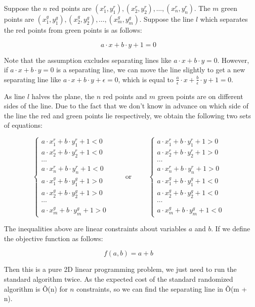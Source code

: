 
Suppose the $n$ red points are $(x_1^r, y_1^r), (x_2^r, y_2^r), \dots, (x_n^r, y_n^r)$. The $m$ green points are $(x_1^g, y_1^g), (x_2^g, y_2^g), \dots, (x_m^g, y_m^g)$. Suppose the line $l$ which separates the red points from green points is as follows:

\[
  a \cdot x + b \cdot y + 1 = 0
\]

Note that the assumption excludes separating lines like $a \cdot x + b \cdot y = 0$. However, if $a \cdot x + b \cdot y = 0$ is a separating line, we can move the line slightly to get a new separating line like $a \cdot x + b \cdot y + \epsilon = 0$, which is equal to $\frac{a}{\epsilon} \cdot x + \frac{b}{\epsilon} \cdot y + 1 = 0$.

As line $l$ halves the plane, the $n$ red points and $m$ green points are on different sides of the line. Due to the fact that we don't know in advance on which side of the line the red and green points lie respectively, we obtain the following two sets of equations:

\[
  \left\{
      \begin{array}{l}
          a \cdot x_1^r + b \cdot y_1^r + 1 < 0 \\
          a \cdot x_2^r + b \cdot y_2^r + 1 < 0 \\
          \cdots \\
          a \cdot x_n^r + b \cdot y_n^r + 1 < 0 \\
          a \cdot x_1^g + b \cdot y_1^g + 1 > 0 \\
          a \cdot x_2^g + b \cdot y_2^g + 1 > 0 \\
          \cdots \\
          a \cdot x_m^g + b \cdot y_m^g + 1 > 0
      \end{array}
  \right.
  \hspace{1cm}\text{or}\hspace{1cm}
  \left\{
      \begin{array}{l}
          a \cdot x_1^r + b \cdot y_1^r + 1 > 0 \\
          a \cdot x_2^r + b \cdot y_2^r + 1 > 0 \\
          \cdots \\
          a \cdot x_n^r + b \cdot y_n^r + 1 > 0 \\
          a \cdot x_1^g + b \cdot y_1^g + 1 < 0 \\
          a \cdot x_2^g + b \cdot y_2^g + 1 < 0 \\
          \cdots \\
          a \cdot x_m^g + b \cdot y_m^g + 1 < 0
      \end{array}
  \right.
\]

The inequalities above are linear constraints about variables $a$ and $b$. If we define the objective function as follows:

\[
  f(a, b) = a + b
\]

Then this is a pure 2D linear programming problem, we just need to run the standard algorithm twice. As the expected cost of the standard randomized algorithm is \~O(n) for $n$ constraints, so we can find the separating line in \~O(m + n).
